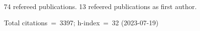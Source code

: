 74 refereed publications. 13 refeered publications as first author.

Total citations~=~3397; h-index~=~32 (2023-07-19)
